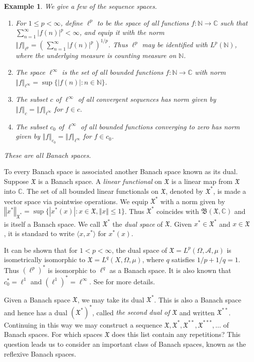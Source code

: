 \documentclass[honours,12pt]{unswthesis}
\newcommand{\C}{\mathbb{C}}
\newcommand{\N}{\mathbb{N}}
\newcommand{\B}{\mathfrak{B}}
\newcommand{\X}{\mathfrak{X}}
\newcommand{\A}{\mathcal{A}}
\def\ip<#1,#2>{\langle #1,#2 \rangle}
\def\lp{\ell^p}
\def\norm#1{\left \Vert #1 \right \Vert}
\newtheorem{example}[theorem]{Example}
\numberwithin{equation}{section}
\begin{document}
\begin{example}
We give a few of the sequence spaces. 
\begin{enumerate}
\item For $1\leq p<\infty$, define $\lp$ to be
the space of all functions $f:\N\rightarrow\C$ such that
$\sum_{n=1}^{\infty}|f(n)|^p<\infty$, and equip it with the norm
$\norm{f}_{\lp}=(\,\sum_{n=1}^{\infty}|f(n)|^p\,)^{1/p}$. Thus $\lp$ may be
identified with $L^p(\N)$, where the underlying measure is counting measure on
$\N$.
\item The space $\ell^{\infty}$ is the set of all bounded functions
$f:\N\rightarrow\C$ with norm $\norm{f}_{\ell^{\infty}}=\sup\{|f(n)|:n\in\N\}$.
\item The subset $c$ of $\ell^{\infty}$ of all convergent sequences 
has norm given by $\norm{f}_c=\norm{f}_{\ell^{\infty}}$ for $f\in c$.
\item The subset $c_0$ of $\ell^{\infty}$ of all bounded functions converging to
zero has norm given by $\norm{f}_{c_0}=\norm{f}_{\ell^{\infty}}$ for $f\in c_0$.
\end{enumerate}These are all Banach spaces.
\end{example}

To every Banach space is associated another Banach space known as its dual.
Suppose $\X$ is a Banach space. A {\em linear functional} on $\X$ is a linear
map from $\X$ into $\C$. The set of all bounded linear functionals on $\X$,
denoted
by $\X^*$, is made a vector space via pointwise operations. We equip $\X^*$ with
a norm given by $\norm{x^*}_{\X^*}=\sup\{|x^*(x)|:x\in\X,\norm{x}\leq 1\}$.
Thus $\X^*$ coincides with $\B(\X,\C)$ and is itself a Banach
space. We call $\X^*$ the {\em dual space} of $\X$. Given $x^*\in\X^*$ and
$x\in\X$, it is standard to write
$\ip<x,x^*>$ for $x^*(x)$.

It can be shown that for $1<p<\infty$, the dual space of $\X=L^p(\Omega,\A,\mu)$
is isometrically isomorphic to $\X=L^q(X,\Omega,\mu)$, where $q$ satisfies
$1/p+1/q=1$. Thus $(\lp)^*$ is isomorphic to $\ell^q$ as a Banach space. It is
also known that $c_0^*=\ell^1$ and $(\ell^1)^*=\ell^{\infty}$. See
\cite[Chapter III, \S 5 and \S 11]{Con} for more details.

Given a Banach space $\X$, we may take its dual $\X^*$. This is also a Banach
space and hence has a dual $(\X^*)^*$, called {\em the second dual of $\X$}
and written $\X^{**}$. Continuing in this way we may construct a sequence
$\X,\X^*,\X^{**},\X^{***},\ldots$ of Banach spaces. For which
spaces $\X$ does this list contain any repetitions? This question leads us to
consider an important class of Banach spaces, known as the reflexive Banach
spaces.
\end{document}

